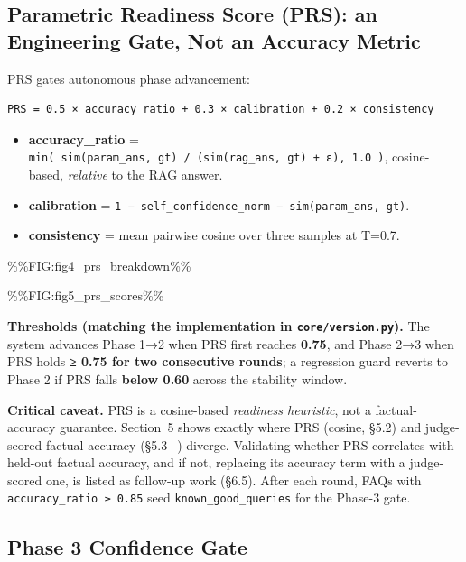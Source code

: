 \hypertarget{parametric-readiness-score-prs-an-engineering-gate-not-an-accuracy-metric}{%
\subsection{Parametric Readiness Score (PRS): an Engineering Gate, Not an Accuracy Metric}\label{parametric-readiness-score-prs-an-engineering-gate-not-an-accuracy-metric}}

PRS gates autonomous phase advancement:

\begin{verbatim}
PRS = 0.5 × accuracy_ratio + 0.3 × calibration + 0.2 × consistency
\end{verbatim}

\begin{itemize}
\tightlist
\item
  \textbf{accuracy\_ratio} = \texttt{min(\ sim(param\_ans,\ gt)\ /\ (sim(rag\_ans,\ gt)\ +\ ε),\ 1.0\ )}, cosine-based, \emph{relative} to the RAG answer.
\item
  \textbf{calibration} = \texttt{1\ −\ \textbar{}self\_confidence\_norm\ −\ sim(param\_ans,\ gt)\textbar{}}.
\item
  \textbf{consistency} = mean pairwise cosine over three samples at T=0.7.
\end{itemize}

\%\%FIG:fig4\_prs\_breakdown\%\%

\%\%FIG:fig5\_prs\_scores\%\%

\textbf{Thresholds (matching the implementation in \texttt{core/version.py}).} The system advances Phase 1→2 when PRS first reaches \textbf{0.75}, and Phase 2→3 when PRS holds \textbf{≥ 0.75 for two consecutive rounds}; a regression guard reverts to Phase 2 if PRS falls \textbf{below 0.60} across the stability window.

\textbf{Critical caveat.} PRS is a cosine-based \emph{readiness heuristic}, not a factual-accuracy guarantee. Section~5 shows exactly where PRS (cosine, §5.2) and judge-scored factual accuracy (§5.3+) diverge. Validating whether PRS correlates with held-out factual accuracy, and if not, replacing its accuracy term with a judge-scored one, is listed as follow-up work (§6.5). After each round, FAQs with \texttt{accuracy\_ratio\ ≥\ 0.85} seed \texttt{known\_good\_queries} for the Phase-3 gate.

\hypertarget{phase-3-confidence-gate}{%
\subsection{Phase 3 Confidence Gate}\label{phase-3-confidence-gate}}

